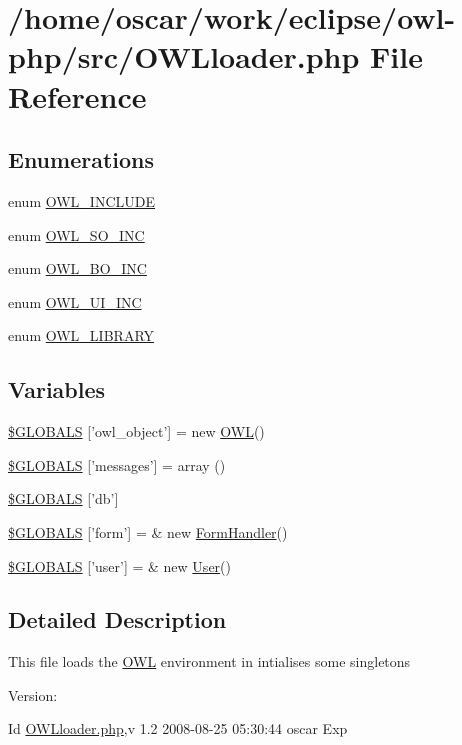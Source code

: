 \hypertarget{OWLloader_8php}{
\section{/home/oscar/work/eclipse/owl-php/src/OWLloader.php File Reference}
\label{OWLloader_8php}
}
\subsection*{Enumerations}
\begin{CompactItemize}
\item 
enum \hyperlink{OWLloader_8php_4d33a8f2fcc9c83cbeea921c4cb23a7f}{OWL\_\-INCLUDE} 
\item 
enum \hyperlink{OWLloader_8php_75dffdef5ba58a0ba5f21ed40627897f}{OWL\_\-SO\_\-INC} 
\item 
enum \hyperlink{OWLloader_8php_ca50646bc73c3addf0e0f25081eae0ae}{OWL\_\-BO\_\-INC} 
\item 
enum \hyperlink{OWLloader_8php_2e11101c70f011a91d0d9c7f8e217738}{OWL\_\-UI\_\-INC} 
\item 
enum \hyperlink{OWLloader_8php_74eed08508c8b70677c4167acf49e427}{OWL\_\-LIBRARY} 
\end{CompactItemize}
\subsection*{Variables}
\begin{CompactItemize}
\item 
\hyperlink{OWLloader_8php_b1ba2f4786a45be835910188036c4cf3}{\$GLOBALS} \mbox{[}'owl\_\-object'\mbox{]} = new \hyperlink{classOWL}{OWL}()
\item 
\hyperlink{OWLloader_8php_65f2996116eed36e9ab25f254a470259}{\$GLOBALS} \mbox{[}'messages'\mbox{]} = array ()
\item 
\hyperlink{OWLloader_8php_14159e18d9b64fd1e16054f784eda311}{\$GLOBALS} \mbox{[}'db'\mbox{]}
\item 
\hyperlink{OWLloader_8php_4c382a365fdd6a17e22f8ee2ee727eb4}{\$GLOBALS} \mbox{[}'form'\mbox{]} = \& new \hyperlink{classFormHandler}{FormHandler}()
\item 
\hyperlink{OWLloader_8php_6ca8a3deb7e1b32adc92d8cb72617832}{\$GLOBALS} \mbox{[}'user'\mbox{]} = \& new \hyperlink{classUser}{User}()
\end{CompactItemize}


\subsection{Detailed Description}
This file loads the \hyperlink{classOWL}{OWL} environment in intialises some singletons \begin{Desc}
\item[Version:]\end{Desc}
\begin{Desc}
\item[Id]\hyperlink{OWLloader_8php}{OWLloader.php},v 1.2 2008-08-25 05:30:44 oscar Exp \end{Desc}


